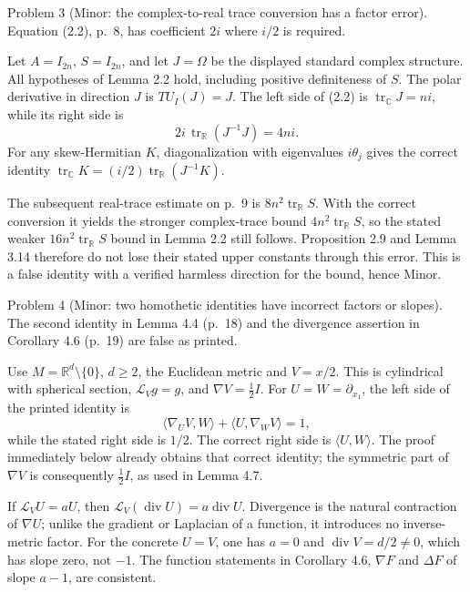 \documentclass[10pt]{article}
\begin{document}
Problem 3 (Minor: the complex-to-real trace conversion has a factor error).  Equation (2.2), p. 8, has coefficient \(2i\) where \(i/2\) is required.\par
Let \(A=I_{2n}\), \(S=I_{2n}\), and let \(J=\Omega\) be the displayed standard complex structure. All hypotheses of Lemma 2.2 hold, including positive definiteness of \(S\). The polar derivative in direction \(J\) is \(TU_I(J)=J\). The left side of (2.2) is \(\operatorname{tr}_\mathbb CJ=ni\), while its right side is \[2i\,\operatorname{tr}_\mathbb R(J^{-1}J)=4ni.\] For any skew-Hermitian \(K\), diagonalization with eigenvalues \(i\theta_j\) gives the correct identity \(\operatorname{tr}_\mathbb CK=(i/2)\operatorname{tr}_\mathbb R(J^{-1}K)\).\par
The subsequent real-trace estimate on p. 9 is \(8n^2\operatorname{tr}_\mathbb RS\). With the correct conversion it yields the stronger complex-trace bound \(4n^2\operatorname{tr}_\mathbb RS\), so the stated weaker \(16n^2\operatorname{tr}_\mathbb RS\) bound in Lemma 2.2 still follows. Proposition 2.9 and Lemma 3.14 therefore do not lose their stated upper constants through this error. This is a false identity with a verified harmless direction for the bound, hence Minor.\par
Problem 4 (Minor: two homothetic identities have incorrect factors or slopes).  The second identity in Lemma 4.4 (p. 18) and the divergence assertion in Corollary 4.6 (p. 19) are false as printed.\par
Use \(M=\mathbb R^d\setminus\{0\}\), \(d\ge2\), the Euclidean metric and \(V=x/2\). This is cylindrical with spherical section, \(\mathcal L_Vg=g\), and \(\nabla V=\tfrac12I\). For \(U=W=\partial_{x_1}\), the left side of the printed identity is \[\langle\nabla_UV,W\rangle+\langle U,\nabla_WV\rangle=1,\] while the stated right side is \(1/2\). The correct right side is \(\langle U,W\rangle\). The proof immediately below already obtains that correct identity; the symmetric part of \(\nabla V\) is consequently \(\tfrac12I\), as used in Lemma 4.7.\par
If \(\mathcal L_VU=aU\), then \(\mathcal L_V(\operatorname{div}U)=a\operatorname{div}U\). Divergence is the natural contraction of \(\nabla U\); unlike the gradient or Laplacian of a function, it introduces no inverse-metric factor. For the concrete \(U=V\), one has \(a=0\) and \(\operatorname{div}V=d/2\ne0\), which has slope zero, not \(-1\). The function statements in Corollary 4.6, \(\nabla F\) and \(\Delta F\) of slope \(a-1\), are consistent.\par
\end{document}
